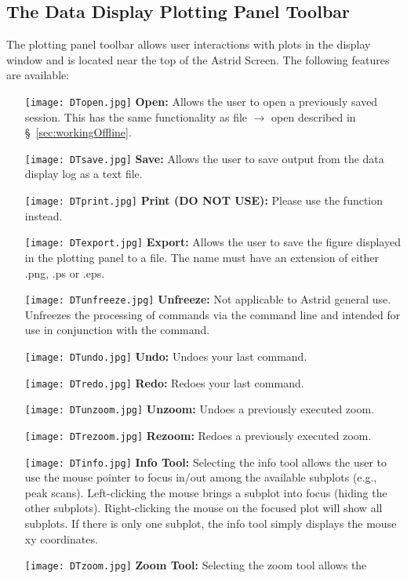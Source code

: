 \subsection{The Data Display Plotting Panel Toolbar}

The plotting panel toolbar allows user interactions with plots in the display window and
is located near the top of the Astrid Screen.  The following features are available:

\begin{itemize}
\item[\texttt{[image: DTopen.jpg]}] {\bf Open:} Allows the user to open a previously
saved session.  This has the same functionality as file $\rightarrow$ open described
in \S~\ref{sec:workingOffline}.
\item[\texttt{[image: DTsave.jpg]}] {\bf Save:} Allows the user to save output from the
data display log as a text file.
\item[\texttt{[image: DTprint.jpg]}] {\bf Print (DO NOT USE):} Please use the 
function instead.
\item[\texttt{[image: DTexport.jpg]}] {\bf Export:}  Allows the user to save the figure
displayed in the plotting panel to a file.  The name must have an extension of either
.png, .ps or .eps.
\item[\texttt{[image: DTunfreeze.jpg]}] {\bf Unfreeze:} Not applicable to Astrid general
use. Unfreezes the processing of commands via the command line and intended for use in
conjunction with the  command.
\item[\texttt{[image: DTundo.jpg]}] {\bf Undo:} Undoes your last command.
\item[\texttt{[image: DTredo.jpg]}] {\bf Redo:} Redoes your last command.
\item[\texttt{[image: DTunzoom.jpg]}] {\bf Unzoom:} Undoes a previously executed zoom.
\item[\texttt{[image: DTrezoom.jpg]}] {\bf Rezoom:} Redoes a previously executed zoom.
\item[\texttt{[image: DTinfo.jpg]}] {\bf Info Tool:} Selecting the info tool allows the
user to use the mouse pointer to focus in/out among the available subplots (e.g., peak
scans). Left-clicking the mouse brings a subplot into focus (hiding the other subplots).
Right-clicking the mouse on the focused plot will show all subplots. If there is only
one subplot, the info tool simply displays the mouse xy coordinates.
\item[\texttt{[image: DTzoom.jpg]}] {\bf Zoom Tool:} Selecting the zoom tool allows the

\end{itemize}
